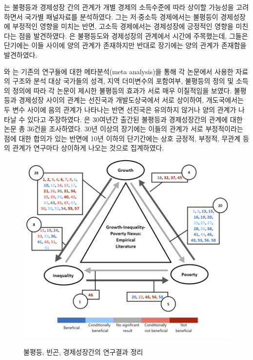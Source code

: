 \citet{cc10}는 불평등과 경제성장 간의 관계가 개별 경제의 소득수준에 따라 상이할 가능성을 고려하면서 국가별 패널자료를 분석하였다.
그는 저$\cdot$중소득 경제에서는 불평등이 경제성장에 부정적인 영향을 미치는 반면, 고소득 경제에서는 경제성장에 긍정적인 영향을 미친다는 점을 발견하였다.
\citet{hetl14}은 불평등도와 경제성장의 관계에서 시간에 주목했는데, 그들은 단기에는 이들 사이에 양의 관계가 존재하지만 반대로 장기에는 양의 관계가 존재함을 발견하였다.

\citet{nns13}와 \citet{nns16}는 기존의 연구들에 대한 메타분석(meta analysis)을 통해 각 논문에서 사용한 자료의 구조와 분석 대상 국가들의 성격, 지역 더미변수의 포함여부, 불평등의 정의 및 소득의 정의에 따라 각 논문이 제시한 불평등의 효과가 서로 매우 이질적임을 보였다.
불평등과 경제성장 사이의 관계는 선진국과 개발도상국에서 서로 상이하여, 개도국에서는 두 변수 사이에 음의 관계가 나타나는 반면 선진국은 유의하지 않거나 양의 관계가 나타날 수 있다고 주장하였다.
\citet{cetl21}은 30여년간 출간된 불평등과 경제성장간의 관계에 대한 논문 총 36건을 조사하였다.
30년 이상의 장기에는 이들의 관계가 서로 부정적이라는 점에 대한 합의가 있는 반면에 10년 이하의 단기간에는 상호 긍정적, 부정적, 무관계 등의 관계가 연구마다 상이하게 나오는 것으로 집계하였다.

\begin{figure}
    \centering
    \caption{불평등, 빈곤, 경제성장간의 연구결과 정리}
    \includegraphics[width=\textwidth]{figure/triangle_relations.png}
    \label{fig:triangle relations}
\end{figure}

